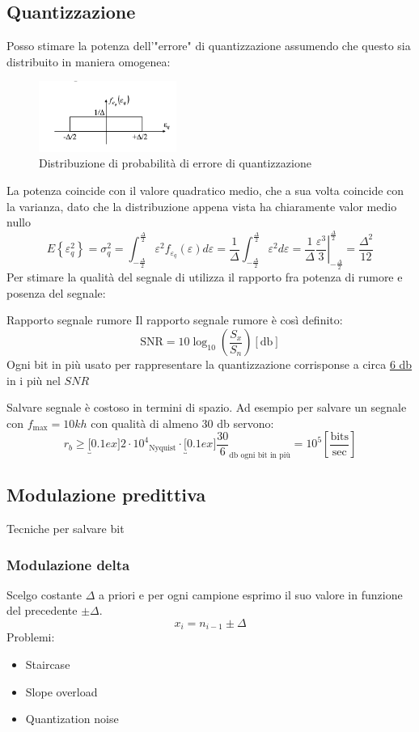 \subsection{Quantizzazione}
Posso stimare la potenza dell'"errore" di quantizzazione assumendo che questo sia distribuito in maniera omogenea:
\begin{figure}[H]
	\begin{center}
		\includegraphics[width = 0.4\textwidth]{Images/Quantizzazione 1.png}
	\end{center}
	\caption{Distribuzione di probabilità di errore di quantizzazione}
\end{figure}
La potenza coincide con il valore quadratico medio, che a sua volta
coincide con la varianza, dato che la distribuzione appena vista ha
chiaramente valor medio nullo
\[
	E\left\{\varepsilon_q^2\right\}=\sigma_q^2=\int_{-\frac{\Delta}{2}}^{\frac{\Delta}{2}} \varepsilon^2 f_{\varepsilon_q}(\varepsilon) d \varepsilon=\frac{1}{\Delta} \int_{-\frac{\Delta}{2}}^{\frac{\Delta}{2}} \varepsilon^2 d \varepsilon=\left.\frac{1}{\Delta} \frac{\varepsilon^3}{3}\right|_{-\frac{\Delta}{2}} ^{\frac{\Delta}{2}}=\frac{\Delta^2}{12}
\]
Per stimare la qualità del segnale di utilizza il rapporto fra potenza di rumore e posenza del segnale:
\begin{definizione}{Rapporto segnale rumore}
	Il rapporto segnale rumore è così definito:
	\[
		\text{SNR} = 10 \log _{10} \left(\frac{S_x}{S_n}\right) \left[\text{db}\right]
	\]
	Ogni bit in più usato per rappresentare la quantizzazione corrisponse a circa \underline{6 db} in i più nel $ SNR $
\end{definizione}
Salvare segnale è costoso in termini di spazio. Ad esempio per salvare un segnale con $ f_{\text{max}} = 10 kh $ con qualità di almeno 30 db servono:
\[
	r_b \ge \underbracket[0.1ex]{2 \cdot  10^{4}}_{\text{Nyquist}} \cdot \underbracket[0.1ex]{\frac{30}{6}}_{\text{db ogni bit in più}} = 10^{5} \left[\frac{\text{bits}}{\text{sec}}\right]
\]
\subsection{Modulazione predittiva}
Tecniche per salvare bit
\subsubsection*{Modulazione delta}
Scelgo costante $ \Delta  $ a priori e per ogni campione esprimo il suo valore in funzione del precedente $ \pm \Delta  $.
\[
	x_i = n_{i-1} \pm \Delta
\]
Problemi:
\begin{itemize}
	\item Staircase
	\item Slope overload
	\item Quantization noise
\end{itemize}
